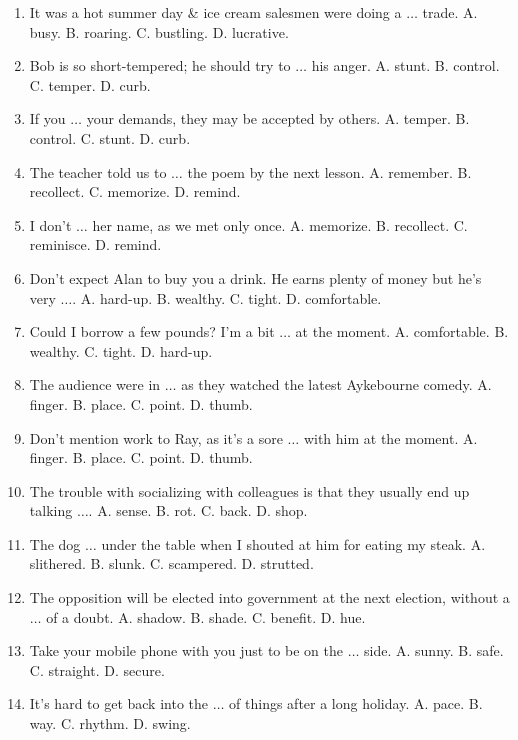 \documentclass{article}
\numberwithin{equation}{section}
\begin{document}
\begin{enumerate}[leftmargin=8mm]
	\item It was a hot summer day \& ice cream salesmen were doing a $\ldots$ trade. {\sf A.} busy. {\sf B.} roaring. {\sf C.} bustling. {\sf D.} lucrative.
	\item Bob is so short-tempered; he should try to $\ldots$ his anger. {\sf A.} stunt. {\sf B.} control. {\sf C.} temper. {\sf D.} curb.
	\item If you $\ldots$ your demands, they may be accepted by others. {\sf A.} temper. {\sf B.} control. {\sf C.} stunt. {\sf D.} curb.
	\item The teacher told us to $\ldots$ the poem by the next lesson. {\sf A.} remember. {\sf B.} recollect. {\sf C.} memorize. {\sf D.} remind.
	\item I don't $\ldots$ her name, as we met only once. {\sf A.} memorize. {\sf B.} recollect. {\sf C.} reminisce. {\sf D.} remind.
	\item Don't expect Alan to buy you a drink. He earns plenty of money but he's very $\ldots$. {\sf A.} hard-up. {\sf B.} wealthy. {\sf C.} tight. {\sf D.} comfortable.
	\item Could I borrow a few pounds? I'm a bit $\ldots$ at the moment. {\sf A.} comfortable. {\sf B.} wealthy. {\sf C.} tight. {\sf D.} hard-up.
	\item The audience were in $\ldots$ as they watched the latest Aykebourne comedy. {\sf A.} finger. {\sf B.} place. {\sf C.} point. {\sf D.} thumb.
	\item Don't mention work to Ray, as it's a sore $\ldots$ with him at the moment. {\sf A.} finger. {\sf B.} place. {\sf C.} point. {\sf D.} thumb.
	\item The trouble with socializing with colleagues is that they usually end up talking $\ldots$. {\sf A.} sense. {\sf B.} rot. {\sf C.} back. {\sf D.} shop.
	\item The dog $\ldots$ under the table when I shouted at him for eating my steak. {\sf A.} slithered. {\sf B.} slunk. {\sf C.} scampered. {\sf D.} strutted.
	\item The opposition will be elected into government at the next election, without a $\ldots$ of a doubt. {\sf A.} shadow. {\sf B.} shade. {\sf C.} benefit. {\sf D.} hue.
	\item Take your mobile phone with you just to be on the $\ldots$ side. {\sf A.} sunny. {\sf B.} safe. {\sf C.} straight. {\sf D.} secure.
	\item It's hard to get back into the $\ldots$ of things after a long holiday. {\sf A.} pace. {\sf B.} way. {\sf C.} rhythm. {\sf D.} swing.

\end{enumerate}
\end{document}
